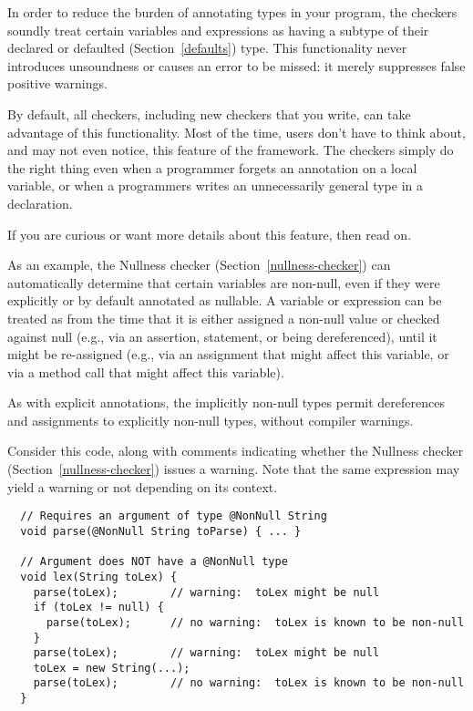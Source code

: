 In order to reduce the burden of annotating types in your program, the
checkers soundly treat certain variables and expressions as having a
subtype of their declared or defaulted (Section~\ref{defaults})
type.  This functionality
never introduces unsoundness or causes an error to be missed:  it merely
suppresses false positive warnings.

By default, all checkers, including new checkers that you write, can take
advantage of this functionality.  Most of the time, users don't have to
think about, and may not even notice, this feature of the framework.  The
checkers simply do the right thing even when a programmer forgets an
annotation on a local variable, or when a programmers writes an
unnecessarily general type in a declaration.

If you are curious or want more details about this feature, then read on.

As an example, the Nullness checker (Section~\ref{nullness-checker}) can automatically
determine that certain variables are non-null, even if they were explicitly
or by default annotated as nullable.
A variable or expression can be treated as 
from the time that it is either
assigned a non-null value or checked against null (e.g., via an assertion,
 statement, or being dereferenced), until it might be re-assigned (e.g.,
via an assignment that might affect this variable, or via a method call
that might affect this variable).

As with explicit annotations, the implicitly non-null types permit
dereferences and assignments to explicitly non-null types, without
compiler warnings.

Consider this code, along with comments indicating whether the
Nullness checker (Section~\ref{nullness-checker}) issues a warning.  Note that the same expression may yield a
warning or not depending on its context.

\begin{Verbatim}
  // Requires an argument of type @NonNull String
  void parse(@NonNull String toParse) { ... }

  // Argument does NOT have a @NonNull type
  void lex(String toLex) {
    parse(toLex);        // warning:  toLex might be null
    if (toLex != null) {
      parse(toLex);      // no warning:  toLex is known to be non-null
    }
    parse(toLex);        // warning:  toLex might be null
    toLex = new String(...);
    parse(toLex);        // no warning:  toLex is known to be non-null
  }
\end{Verbatim}


